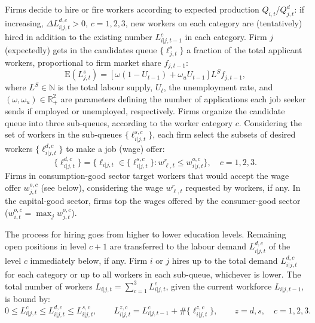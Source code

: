 \documentclass[a4paper,11pt]{article}
\begin{document}
\begin{appendices}
Firms decide to hire or fire workers according to expected production $Q_{i,t}$/$Q^d_{j,t}$: if increasing, $\Delta L_{i|j,t}^{d,c} > 0$, $c = 1, 2, 3$, new workers on each category are (tentatively) hired in addition to the existing number $L_{i|j,t-1}^c$ in each category. Firm $j$ (expectedly) gets in the candidates queue $\{\ell^s_{j,t} \}$ a fraction of the total applicant workers, proportional to firm market share $f_{j,t-1}$:
\begin{equation}
	\mathrm{E}(L^s_{j,t}) = \left[ \omega \left( 1 - U_{t-1} \right) + \omega_u U_{t-1} \right] L^S f_{j,t-1},
\end{equation}
where $L^S \in \mathbb{N}$ is the total labour supply, $U_t$, the unemployment rate, and $(\omega, \omega_u) \in \mathbb{R}^2_+$ are parameters defining the number of applications each job seeker sends if employed or unemployed, respectively. Firms organize the candidate queue into three sub-queues, according to the worker category $c$. Considering the set of workers in the sub-queues $\{\ell_{i|j,t}^{s,c}\}$, each firm select the subsets of desired workers $\{ \ell_{i|j,t}^{d,c} \}$ to make a job (wage) offer:
\begin{equation}
	\{ \ell_{i|j,t}^{d,c} \} = \{\ell_{i|j,t} \in \{\ell_{i|j,t}^{s,c} \}: w^r_{\ell,t} \le w_{i|j,t}^{o,c}\}, \quad c = 1,2,3.
\end{equation}
Firms in consumption-good sector target workers that would accept the wage offer $w_{j,t}^{o,c}$ (see below), considering the wage $w^r_{\ell,t}$ requested by workers, if any. In the capital-good sector, firms top the wages offered by the consumer-good sector ($w_{i,t}^{o,c} = \max_j w_{j,t}^{o,c}$).

The process for hiring goes from higher to lower education levels. Remaining open positions in level $c+1$ are transferred to the labour demand $L_{i|j,t}^{d,c}$ of the level $c$ immediately below, if any. Firm $i$ or $j$ hires up to the total demand $L_{i|j,t}^{d,c}$ for each category or up to all workers in each sub-queue, whichever is lower. The total number of workers $L_{i|j,t} = \sum_{c=1}^{3} L_{i|j,t}^c$, given the current workforce $L_{i|j,t-1}$, is bound by:
\begin{equation}
	0 \leq L_{i|j,t}^c \leq L_{i|j,t}^{d,c} \leq L_{i|j,t}^{s,c}, \qquad L_{i|j,t}^{z,c} = L_{i|j,t-1}^c + \#\{\ell_{i|j,t}^{z,c}\}, \qquad z = d,s, \quad c = 1,2,3.
\end{equation}


\end{appendices}
\end{document}
